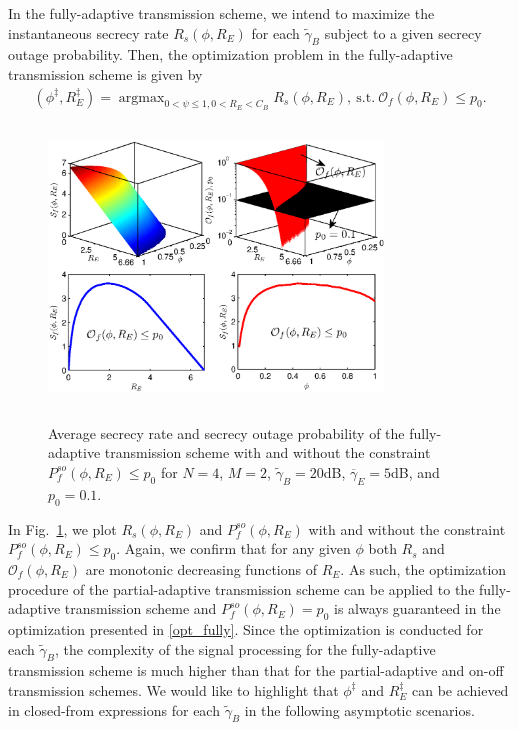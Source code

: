 \documentclass[journal]{IEEEtran}
\DeclareMathOperator*{\argmax}{argmax}
\begin{document}
In the fully-adaptive transmission scheme, we intend to maximize the instantaneous secrecy rate $R_s(\phi, R_E)$ for each $\widetilde{\gamma}_B$ subject to a given secrecy outage probability. Then, the optimization problem in the fully-adaptive transmission scheme is given by
\begin{align}\label{opt_fully}
(\phi^{\ddag}, R_E^{\ddag}) \!=\! \argmax_{0< \psi \leq 1, 0< R_E< C_B} R_s (\phi, R_E), ~\text{s.t.}~ \mathcal{O}_f(\phi, R_E) \leq p_0.
\end{align}

\begin{figure}[!t]
    \begin{center}
   {\includegraphics[width=3.5in, height=2.9in]{fully_opt_nogrid.eps}}
    \caption{Average secrecy rate and secrecy outage probability of the fully-adaptive transmission scheme with and without the constraint $P^{so}_f(\phi, R_E) \leq p_0$ for $N = 4$, $M =2$, $\widetilde{\gamma}_B = 20$dB, $\overline{\gamma}_E = 5$dB, and $p_0 = 0.1$. }\label{fig:opt_fully}
    \end{center}
\end{figure}


In Fig.~\ref{fig:opt_fully}, we plot $R_s(\phi, R_E)$ and $P^{so}_f(\phi, R_E)$ with and without the constraint $P^{so}_f(\phi, R_E) \leq p_0$. Again, we confirm that for any given $\phi$ both $R_s$ and $\mathcal{O}_f(\phi, R_E)$ are monotonic decreasing functions of $R_E$. As such, the optimization procedure of the partial-adaptive transmission scheme can be applied to the fully-adaptive transmission scheme and $P^{so}_f(\phi, R_E) = p_0$ is always guaranteed in the optimization presented in \eqref{opt_fully}. Since the optimization is conducted for each $\widetilde{\gamma}_B$, the complexity of the signal processing for the fully-adaptive transmission scheme is much higher than that for the partial-adaptive and on-off transmission schemes. We would like to highlight that $\phi^{\ddag}$ and $R_E^{\ddag}$ can be achieved in closed-from expressions for each $\widetilde{\gamma}_B$ in the following asymptotic scenarios.
\end{document}
